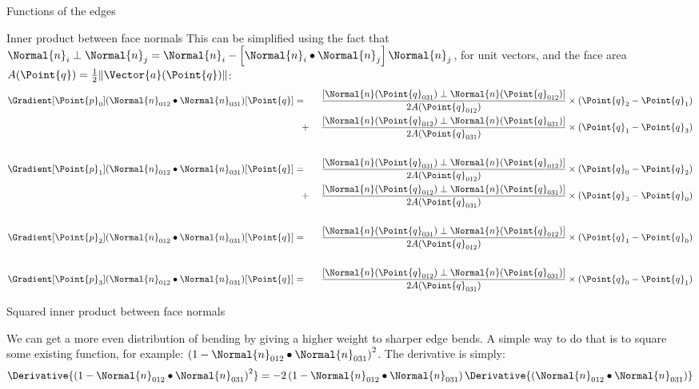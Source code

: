 \begin{plSection}{Functions of the edges}
\begin{plSection}{Inner product between face normals}
This can be simplified using the fact that
\(\Normal{n}_i \perp \Normal{n}_j = \Normal{n}_i - \left[ \Normal{n}_i \bullet \Normal{n}_j \right] \Normal{n}_j\), for unit vectors,
and the face area \(A(\Point{q}) = \frac{1}{2} \| \Vector{a}(\Point{q}) \|\):
\begin{eqnarray}
\label{eq:simplified_normal_dot_gradient}
\Gradient[\Point{p}_0]{(\Normal{n}_{012} \bullet \Normal{n}_{031})}[\Point{q}]
& = \;\;\; &
\frac{\left[ \Normal{n}(\Point{q}_{031}) \perp \Normal{n}(\Point{q}_{012}) \right]}{2A(\Point{q}_{012})}
\times (\Point{q}_2 - \Point{q}_1)
\\
& \;\;\; + &
\frac{\left[ \Normal{n}(\Point{q}_{012}) \perp \Normal{n}(\Point{q}_{031}) \right]}{2A(\Point{q}_{031})}
\times (\Point{q}_1 - \Point{q}_3)
\nonumber \\
& & \nonumber \\
\Gradient[\Point{p}_1]{(\Normal{n}_{012} \bullet \Normal{n}_{031})}[\Point{q}]
& = \;\;\; &
\frac{\left[ \Normal{n}(\Point{q}_{031}) \perp \Normal{n}(\Point{q}_{012}) \right]}{2A(\Point{q}_{012})}
\times (\Point{q}_0 - \Point{q}_2)
\nonumber \\
& \;\;\; + &
\frac{\left[ \Normal{n}(\Point{q}_{012}) \perp \Normal{n}(\Point{q}_{031}) \right]}{2A(\Point{q}_{031})}
\times (\Point{q}_3 - \Point{q}_0)
\nonumber \\
& & \nonumber \\
\Gradient[\Point{p}_2]{(\Normal{n}_{012} \bullet \Normal{n}_{031})}[\Point{q}]
& = \;\;\; &
\frac{\left[ \Normal{n}(\Point{q}_{031}) \perp \Normal{n}(\Point{q}_{012}) \right]}{2A(\Point{q}_{012})}
\times (\Point{q}_1 - \Point{q}_0)
\nonumber \\
& & \nonumber \\
\Gradient[\Point{p}_3]{(\Normal{n}_{012} \bullet \Normal{n}_{031})}[\Point{q}]
& = \;\;\; &
\frac{\left[ \Normal{n}(\Point{q}_{012}) \perp \Normal{n}(\Point{q}_{031}) \right]}{2A(\Point{q}_{031})}
\times (\Point{q}_0 - \Point{q}_1)
\nonumber
\end{eqnarray}

\end{plSection}%
\begin{plSection}{Squared inner product between face normals}
\label{sec:squared_normal_dot}

We can get a more even distribution of bending by giving
a higher weight to sharper edge bends.
A simple way to do that is to square some existing function,
for example: $\left(1 - \Normal{n}_{012} \bullet \Normal{n}_{031}\right)^2$.
The derivative is simply:
\begin{equation}
\Derivative{\left(1 - \Normal{n}_{012} \bullet \Normal{n}_{031}\right)^2}
= -2 \left( 1 - \Normal{n}_{012} \bullet \Normal{n}_{031} \right)
\Derivative{(\Normal{n}_{012} \bullet \Normal{n}_{031})}
\end{equation}


\end{plSection}
\end{plSection}

